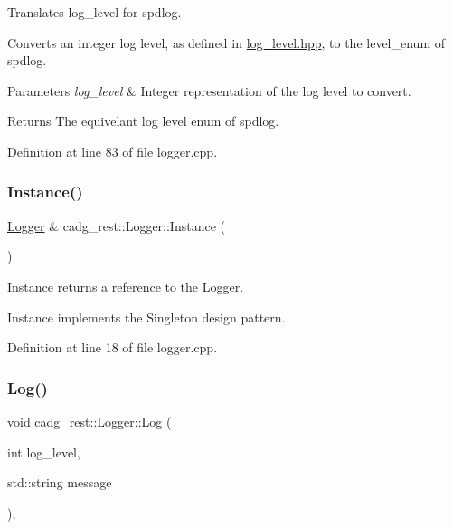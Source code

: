 Translates log\+\_\+level for spdlog. 

Converts an integer log level, as defined in \mbox{\hyperlink{log__level_8hpp}{log\+\_\+level.\+hpp}}, to the level\+\_\+enum of spdlog. 
\begin{DoxyParams}{Parameters}
{\em log\+\_\+level} & Integer representation of the log level to convert. \\
\hline
\end{DoxyParams}
\begin{DoxyReturn}{Returns}
The equivelant log level enum of spdlog. 
\end{DoxyReturn}


Definition at line 83 of file logger.\+cpp.

\mbox{\label{classcadg__rest_1_1_logger_acd53ca40ec816a668c5c5201a05e9f6c}} 
\subsubsection{\texorpdfstring{Instance()}{Instance()}}
{\footnotesize\ttfamily \mbox{\hyperlink{classcadg__rest_1_1_logger}{Logger}} \& cadg\+\_\+rest\+::\+Logger\+::\+Instance (\begin{DoxyParamCaption}{ }\end{DoxyParamCaption})\hspace{0.3cm}{\ttfamily [static]}}



Instance returns a reference to the \mbox{\hyperlink{classcadg__rest_1_1_logger}{Logger}}. 

Instance implements the Singleton design pattern. 

Definition at line 18 of file logger.\+cpp.

\mbox{\label{classcadg__rest_1_1_logger_a192e92e4e3137687bedbfd1157257e78}} 
\subsubsection{\texorpdfstring{Log()}{Log()}\hspace{0.1cm}{\footnotesize\ttfamily [1/3]}}
{\footnotesize\ttfamily void cadg\+\_\+rest\+::\+Logger\+::\+Log (\begin{DoxyParamCaption}\item[{int}]{log\+\_\+level,  }\item[{std\+::string}]{message }\end{DoxyParamCaption})\hspace{0.3cm}{\ttfamily [override]}, {\ttfamily [virtual]}}



